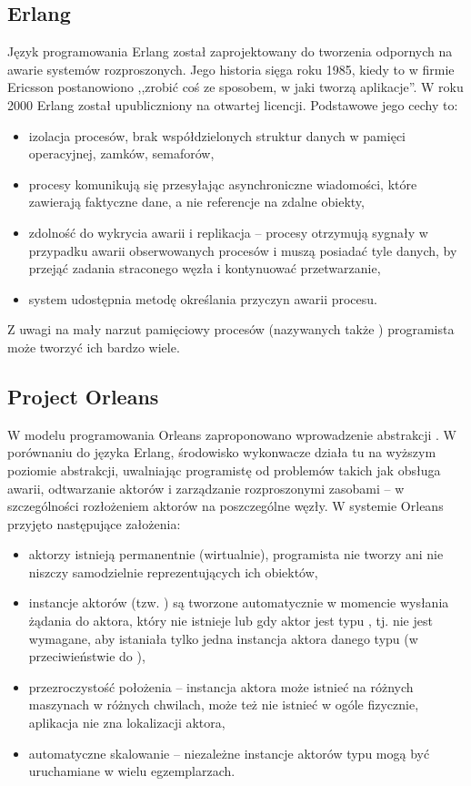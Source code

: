 \subsection{Erlang}

Język programowania Erlang \cite{Erlang-Armstrong:2010:ERL:1810891.1810910}
został zaprojektowany do tworzenia odpornych na awarie systemów rozproszonych.
Jego historia sięga roku 1985, kiedy to w firmie Ericsson postanowiono
,,zrobić coś ze sposobem, w jaki tworzą aplikacje''. W roku 2000 Erlang
został upubliczniony na otwartej licencji. Podstawowe jego cechy to:
\begin{itemize}
\item izolacja procesów, brak współdzielonych struktur danych w pamięci
operacyjnej, zamków, semaforów,
\item procesy komunikują się przesyłając asynchroniczne wiadomości, które
zawierają faktyczne dane, a nie referencje na zdalne obiekty,
\item zdolność do wykrycia awarii i replikacja -- procesy otrzymują sygnały
w przypadku awarii obserwowanych procesów i muszą posiadać tyle danych,
by przejąć zadania straconego węzła i kontynuować przetwarzanie,
\item system udostępnia metodę określania przyczyn awarii procesu.
\end{itemize}
Z uwagi na mały narzut pamięciowy procesów (nazywanych także )
programista może tworzyć ich bardzo wiele. 


\subsection{Project Orleans}

W modelu programowania Orleans \cite{Orleans-export:210931} zaproponowano
wprowadzenie abstrakcji . W porównaniu
do języka Erlang, środowisko wykonwacze działa tu na wyższym poziomie
abstrakcji, uwalniając programistę od problemów takich jak obsługa
awarii, odtwarzanie aktorów i zarządzanie rozproszonymi zasobami --
w szczególności rozłożeniem aktorów na poszczególne węzły. W systemie
Orleans przyjęto następujące założenia:
\begin{itemize}
\item aktorzy istnieją permanentnie (wirtualnie), programista nie tworzy
ani nie niszczy samodzielnie reprezentujących ich obiektów,
\item instancje aktorów (tzw. ) są tworzone automatycznie
w momencie wysłania żądania do aktora, który nie istnieje lub gdy
aktor jest typu , tj. nie jest wymagane,
aby istaniała tylko jedna instancja aktora danego typu (w przeciwieństwie
do ),
\item przezroczystość położenia -- instancja aktora może istnieć na różnych
maszynach w różnych chwilach, może też nie istnieć w ogóle fizycznie,
aplikacja nie zna lokalizacji aktora,
\item automatyczne skalowanie -- niezależne instancje aktorów typu 
mogą być uruchamiane w wielu egzemplarzach.
\end{itemize}

